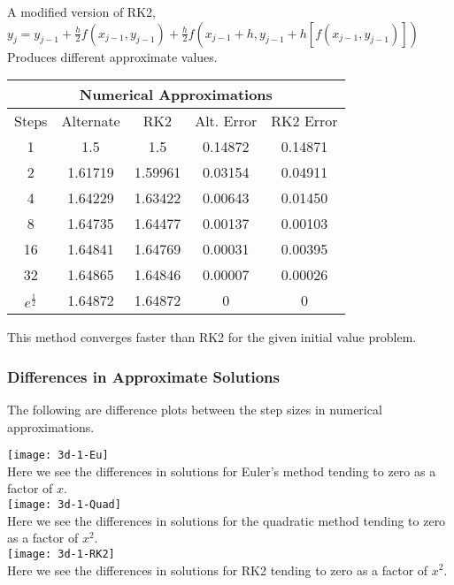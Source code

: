 \documentclass[12pt]{article}
\begin{document}
	A modified version of RK2, \\
	$y_{j}=y_{j-1}+\frac{h}{2}f(x_{j-1},y_{j-1})+\frac{h}{2}f(x_{j-1}+h,y_{j-1}+h[f(x_{j-1},y_{j-1})])$
	\\Produces different approximate values.
	
	\begin{center}
		\begin{tabular}{ |c||c|c|c|c| } 
			\hline
			\multicolumn{5}{|c|}{\textbf{Numerical Approximations}} \\
			\hline
			\hline
			Steps & Alternate & RK2 & Alt. Error & RK2 Error \\
			\hline
			1 & 1.5 & 1.5 & 0.14872 & 0.14871 \\ 
			\hline
			2 & 1.61719 & 1.59961 &  0.03154 & 0.04911  \\ 
			\hline
			4 & 1.64229  & 1.63422 & 0.00643  & 0.01450  \\ 
			\hline
			8 & 1.64735 & 1.64477 & 0.00137 & 0.00103  \\ 
			\hline
			16 & 1.64841 & 1.64769 & 0.00031 & 0.00395  \\ 
			\hline
			32 & 1.64865 & 1.64846 & 0.00007 & 0.00026  \\ 
			\hline
			\hline
			$e^{\frac{1}{2}}$ & 1.64872 & 1.64872 & 0 & 0 \\ 
			\hline
		\end{tabular}
	\end{center}
	
	This method converges faster than RK2 for the given initial value problem.
	
	\subsubsection{Differences in Approximate Solutions}
	
	The following are difference plots between the step sizes in numerical approximations. 
	
	\texttt{[image: 3d-1-Eu]}
	\\
	Here we see the differences in solutions for Euler's method tending to zero as a factor of $x$.
	\\
	\texttt{[image: 3d-1-Quad]}
	\\
	Here we see the differences in solutions for the quadratic method tending to zero as a factor of $x^{2}$.
	\\
	\texttt{[image: 3d-1-RK2]}
	\\
	Here we see the differences in solutions for RK2 tending to zero as a factor of $x^{2}$.
	
\end{document}
